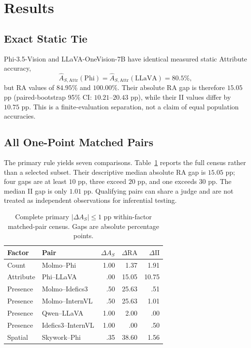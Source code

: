 \section{Results}
\label{sec:results}

\subsection{Exact Static Tie}
\label{sec:exact_match}

Phi-3.5-Vision and LLaVA-OneVision-7B have identical measured static Attribute
accuracy,
\begin{equation}
\widehat A_{S,\mathrm{Attr}}(\mathrm{Phi})=
\widehat A_{S,\mathrm{Attr}}(\mathrm{LLaVA})=80.5\%,
\label{eq:exact_static_tie}
\end{equation}
but RA values of $84.95\%$ and $100.00\%$. Their absolute RA gap is therefore
$15.05$ pp (paired-bootstrap 95\% CI: $10.21$--$20.43$ pp), while their II
values differ by $10.75$ pp. This is a finite-evaluation separation, not a
claim of equal population accuracies.

\subsection{All One-Point Matched Pairs}
\label{sec:near_match}

The primary rule yields seven comparisons. Table~\ref{tab:main-matched-pairs}
reports the full census rather than a selected subset. Their descriptive median
absolute RA gap is $15.05$ pp; four gaps are at least $10$ pp, three exceed
$20$ pp, and one exceeds $30$ pp. The median II gap is only $1.01$ pp.
Qualifying pairs can share a judge and are not treated as independent
observations for inferential testing.

\begin{table}[t]
\centering
\small
\caption{Complete primary $|\Delta A_S|\leq1$ pp within-factor matched-pair
census. Gaps are absolute percentage points.}
\label{tab:main-matched-pairs}
\begin{tabular}{llrrr}
\toprule
Factor & Pair & $\Delta A_S$ & $\Delta\mathrm{RA}$ & $\Delta\mathrm{II}$\\
\midrule
Count & Molmo--Phi & 1.00 & 1.37 & 1.91\\
Attribute & Phi--LLaVA & .00 & 15.05 & 10.75\\
Presence & Molmo--Idefics3 & .50 & 25.63 & .51\\
Presence & Molmo--InternVL & .50 & 25.63 & 1.01\\
Presence & Qwen--LLaVA & 1.00 & 2.00 & .00\\
Presence & Idefics3--InternVL & 1.00 & .00 & .50\\
Spatial & Skywork--Phi & .35 & 38.60 & 1.56\\
\bottomrule
\end{tabular}
\end{table}


